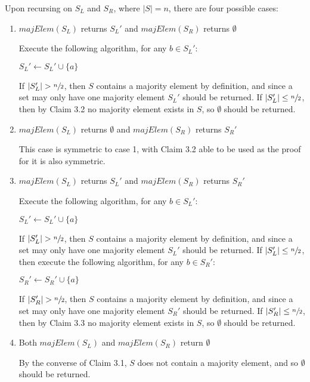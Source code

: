 \documentclass{article}
\begin{document}
Upon recursing on $S_L$ and $S_R$, where $|S|=n$, there are four possible cases:

\begin{enumerate}
\item $majElem(S_L)$ returns $S_L'$ and $majElem(S_R)$ returns $\emptyset$

Execute the following algorithm, for any $b \in S_L'$:
\begin{algorithmic}
		\STATE $S_L' \gets S_L' \cup \{a\}$
	\ENDIF
\ENDFOR
\end{algorithmic}
If $|S_L'| > \sfrac{n}{2}$, then $S$ contains a majority element by definition,
and since a set may only have one majority element $S_L'$ should be returned.
If $|S_L'| \leq \sfrac{n}{2}$, then by Claim 3.2 no majority element exists in
$S$, so $\emptyset$ should be returned.

\item $majElem(S_L)$ returns $\emptyset$ and $majElem(S_R)$ returns $S_R'$

This case is symmetric to case 1, with Claim 3.2 able to be used as the proof
for it is also symmetric.

\item $majElem(S_L)$ returns $S_L'$ and $majElem(S_R)$ returns $S_R'$

Execute the following algorithm, for any $b \in S_L'$:
\begin{algorithmic}
		\STATE $S_L' \gets S_L' \cup \{a\}$
	\ENDIF
\ENDFOR
\end{algorithmic}
If $|S_L'| > \sfrac{n}{2}$, then $S$ contains a majority element by definition,
and since a set may only have one majority element $S_L'$ should be returned.
If $|S_L'| \leq \sfrac{n}{2}$, then execute the following algorithm, for any $b
\in S_R'$:
\begin{algorithmic}
		\STATE $S_R' \gets S_R' \cup \{a\}$
	\ENDIF
\ENDFOR
\end{algorithmic}
If $|S_R'| > \sfrac{n}{2}$, then $S$ contains a majority element by definition,
and since a set may only have one majority element $S_R'$ should be returned.
If $|S_R'| \leq \sfrac{n}{2}$, then by Claim 3.3 no majority element exists in
$S$, so $\emptyset$ should be returned.

\item Both $majElem(S_L)$ and $majElem(S_R)$ return $\emptyset$

By the converse of Claim 3.1, $S$ does not contain a majority element, and so
$\emptyset$ should be returned.

\end{enumerate}
\end{document}

